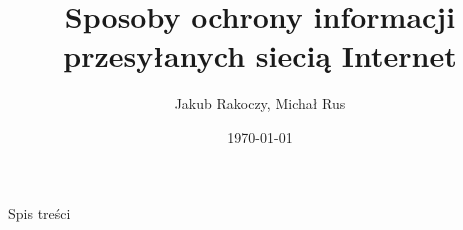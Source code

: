\documentclass{beamer}
\begin{document}
\title[Sposoby ochrony informacji przesyłanych siecią Internet]{Sposoby ochrony informacji przesyłanych siecią Internet} 
\author{Jakub Rakoczy, Michał Rus} 
\date{\today} 

\begin{frame}[plain]
  \titlepage
\end{frame}


\begin{frame}{Spis treści}
  \tableofcontents
\end{frame}







\end{document}
